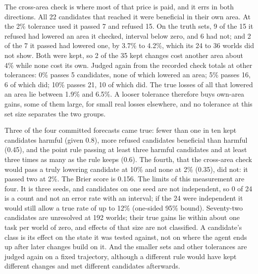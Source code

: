 \documentclass[11pt]{article}
\begin{document}
The cross-area check is where most of that price is paid, and it errs in both directions. All 22 candidates that reached it were beneficial in their own area. At the 2\% tolerance used it passed 7 and refused 15. On the truth sets, 9 of the 15 it refused had lowered an area it checked, interval below zero, and 6 had not; and 2 of the 7 it passed had lowered one, by 3.7\% to 4.2\%, which its 24 to 36 worlds did not show. Both were kept, so 2 of the 35 kept changes cost another area about 4\% while none cost its own. Judged again from the recorded check totals at other tolerances: 0\% passes 5 candidates, none of which lowered an area; 5\% passes 16, 6 of which did; 10\% passes 21, 10 of which did. The true losses of all that lowered an area lie between 1.9\% and 6.5\%. A looser tolerance therefore buys own-area gains, some of them large, for small real losses elsewhere, and no tolerance at this set size separates the two groups.

Three of the four committed forecasts came true: fewer than one in ten kept candidates harmful (given 0.8), more refused candidates beneficial than harmful (0.45), and the point rule passing at least three harmful candidates and at least three times as many as the rule keeps (0.6). The fourth, that the cross-area check would pass a truly lowering candidate at 10\% and none at 2\% (0.35), did not: it passed two at 2\%. The Brier score is 0.156. The limits of this measurement are four. It is three seeds, and candidates on one seed are not independent, so 0 of 24 is a count and not an error rate with an interval; if the 24 were independent it would still allow a true rate of up to 12\% (one-sided 95\% bound). Seventy-two candidates are unresolved at 192 worlds; their true gains lie within about one task per world of zero, and effects of that size are not classified. A candidate's class is its effect on the state it was tested against, not on where the agent ends up after later changes build on it. And the smaller sets and other tolerances are judged again on a fixed trajectory, although a different rule would have kept different changes and met different candidates afterwards.


\end{document}
